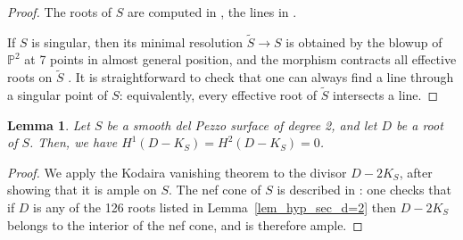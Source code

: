 \documentclass[11pt]{amsart}
\newtheorem{lemma}[thm]{Lemma}
\theoremstyle{definition}
\newcommand{\pr}[1]{\mathbb P^{#1}}
\DeclareMathOperator{\Pic}{Pic\,}
\newcommand{\sO}{\mathcal{O}}
\DeclarePairedDelimiter{\abs}{\lvert}{\rvert}
\begin{document}
\begin{proof}
The roots of $S$ are computed in \cite[\S 8.2.3]{Dol12}, the lines in \cite[\S 6.1.1]{Dol12}. 

If $S$ is singular, then its minimal resolution $\tilde{S}\to S$ is obtained by the blowup of $\pr 2$ at 7 points in almost general position, and the morphism contracts all effective roots on $\tilde{S}$ \cite[Theorem 3.4]{hidaka1981}. It is straightforward to check that one can always find a line through a singular point of $S$: equivalently, every effective root of $\tilde{S}$ intersects a line.
\end{proof}


\begin{lemma}\label{lem_KodairaVan}
Let $S$ be a smooth del Pezzo surface of degree 2, and let $D$ be a root of $S$. Then, we have $H^1(D-K_S)=H^2(D-K_S)=0$.  
\end{lemma}

\begin{proof}
We apply the Kodaira vanishing theorem to the divisor $D-2K_S$, after showing that it is ample on $S$. 
The nef cone of $S$ is described in \cite[Theorem 2.4]{BC13}: one checks that if $D$ is any of the 126 roots listed in Lemma~\ref{lem_hyp_sec_d=2} then $D-2K_S$ belongs to the interior of the nef cone, and is therefore ample.
\end{proof}
\end{document}
